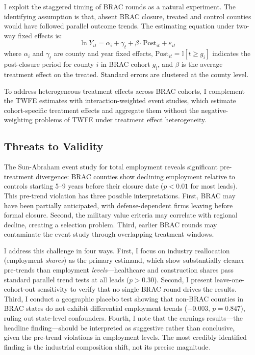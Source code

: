 \documentclass[12pt]{article}
\newcommand{\ind}{\mathbb{I}}
\begin{document}
I exploit the staggered timing of BRAC rounds as a natural experiment. The identifying assumption is that, absent BRAC closure, treated and control counties would have followed parallel outcome trends. The estimating equation under two-way fixed effects is:
\begin{equation}
\ln Y_{it} = \alpha_i + \gamma_t + \beta \cdot \text{Post}_{it} + \varepsilon_{it}
\end{equation}
where $\alpha_i$ and $\gamma_t$ are county and year fixed effects, $\text{Post}_{it} = \ind[t \geq g_i]$ indicates the post-closure period for county $i$ in BRAC cohort $g_i$, and $\beta$ is the average treatment effect on the treated. Standard errors are clustered at the county level.

To address heterogeneous treatment effects across BRAC cohorts, I complement the TWFE estimates with \citet{sun2021} interaction-weighted event studies, which estimate cohort-specific treatment effects and aggregate them without the negative-weighting problems of TWFE under treatment effect heterogeneity.

\subsection{Threats to Validity}

The Sun-Abraham event study for total employment reveals significant pre-treatment divergence: BRAC counties show declining employment relative to controls starting 5--9 years before their closure date ($p < 0.01$ for most leads). This pre-trend violation has three possible interpretations. First, BRAC may have been partially anticipated, with defense-dependent firms leaving before formal closure. Second, the military value criteria may correlate with regional decline, creating a selection problem. Third, earlier BRAC rounds may contaminate the event study through overlapping treatment windows.

I address this challenge in four ways. First, I focus on industry reallocation (employment \textit{shares}) as the primary estimand, which show substantially cleaner pre-trends than employment \textit{levels}---healthcare and construction shares pass standard parallel trend tests at all leads ($p > 0.30$). Second, I present leave-one-cohort-out sensitivity to verify that no single BRAC round drives the results. Third, I conduct a geographic placebo test showing that non-BRAC counties in BRAC states do not exhibit differential employment trends ($-0.003$, $p = 0.847$), ruling out state-level confounders. Fourth, I note that the earnings results---the headline finding---should be interpreted as suggestive rather than conclusive, given the pre-trend violations in employment levels. The most credibly identified finding is the industrial composition shift, not its precise magnitude.
\end{document}
